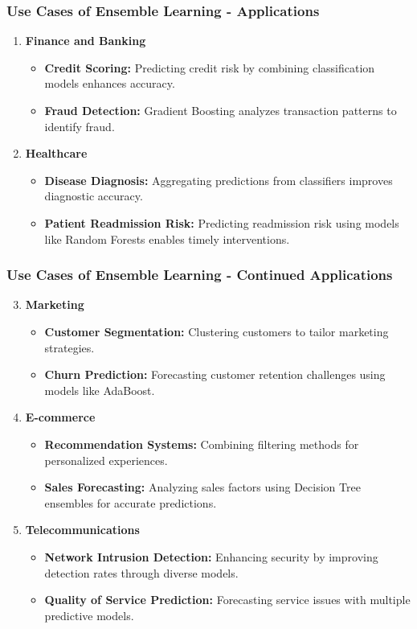 \documentclass[aspectratio=169]{beamer}
\begin{document}
\begin{frame}[fragile]
  \frametitle{Use Cases of Ensemble Learning - Applications}
  \begin{enumerate}
    \item \textbf{Finance and Banking}
      \begin{itemize}
        \item \textbf{Credit Scoring:} Predicting credit risk by combining classification models enhances accuracy.
        \item \textbf{Fraud Detection:} Gradient Boosting analyzes transaction patterns to identify fraud.
      \end{itemize}
    
    \item \textbf{Healthcare}
      \begin{itemize}
        \item \textbf{Disease Diagnosis:} Aggregating predictions from classifiers improves diagnostic accuracy.
        \item \textbf{Patient Readmission Risk:} Predicting readmission risk using models like Random Forests enables timely interventions.
      \end{itemize}
  \end{enumerate}
\end{frame}

\begin{frame}[fragile]
  \frametitle{Use Cases of Ensemble Learning - Continued Applications}
  \begin{enumerate}
    \setcounter{enumi}{2}  %
    \item \textbf{Marketing}
      \begin{itemize}
        \item \textbf{Customer Segmentation:} Clustering customers to tailor marketing strategies.
        \item \textbf{Churn Prediction:} Forecasting customer retention challenges using models like AdaBoost.
      \end{itemize}
    
    \item \textbf{E-commerce}
      \begin{itemize}
        \item \textbf{Recommendation Systems:} Combining filtering methods for personalized experiences.
        \item \textbf{Sales Forecasting:} Analyzing sales factors using Decision Tree ensembles for accurate predictions.
      \end{itemize}

    \item \textbf{Telecommunications}
      \begin{itemize}
        \item \textbf{Network Intrusion Detection:} Enhancing security by improving detection rates through diverse models.
        \item \textbf{Quality of Service Prediction:} Forecasting service issues with multiple predictive models.
      \end{itemize}
  \end{enumerate}
\end{frame}
\end{document}
